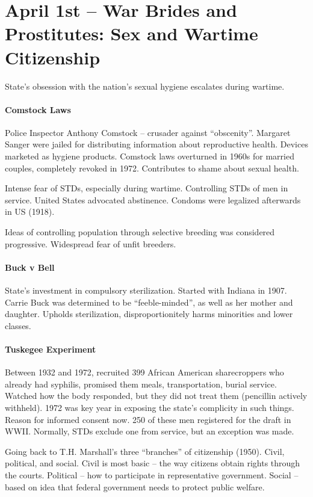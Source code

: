 \section{April 1st -- War Brides and Prostitutes: Sex and Wartime Citizenship}

State's obsession with the nation's sexual hygiene escalates during wartime.

\paragraph{Comstock Laws} Police Inspector Anthony Comstock -- crusader against ``obscenity''. Margaret Sanger were jailed for distributing information about reproductive health. Devices marketed as hygiene products. Comstock laws overturned in 1960s for married couples, completely revoked in 1972. Contributes to shame about sexual health.

Intense fear of STDs, especially during wartime. Controlling STDs of men in service. United States advocated abstinence. Condoms were legalized afterwards in US (1918).

Ideas of controlling population through selective breeding was considered progressive. Widespread fear of unfit breeders. 

\paragraph{Buck v Bell} State's investment in compulsory sterilization. Started with Indiana in 1907. Carrie Buck was determined to be ``feeble-minded'', as well as her mother and daughter. Upholds sterilization, disproportionitely harms minorities and lower classes.

\paragraph{Tuskegee Experiment} Between 1932 and 1972, recruited 399 African American sharecroppers who already had syphilis, promised them meals, transportation, burial service. Watched how the body responded, but they did not treat them (pencillin actively withheld). 1972 was key year in exposing the state's complicity in such things. Reason for informed consent now. 250 of these men registered for the draft in WWII. Normally, STDs exclude one from service, but an exception was made.

Going back to T.H. Marshall's three ``branches'' of citizenship (1950). Civil, political, and social. Civil is most basic -- the way citizens obtain rights through the courts. Political -- how to participate in representative government. Social -- based on idea that federal government needs to protect public welfare.

